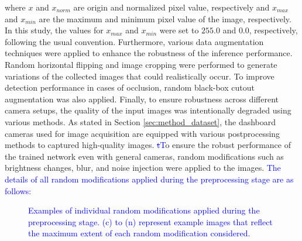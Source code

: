 where $x$ and $x_{norm}$ are origin and normalized pixel value, respectively and $x_{max}$ and $x_{min}$ are the maximum and minimum pixel value of the image, respectively.
In this study, the values for $x_{max}$ and $x_{min}$ were set to $255.0$ and $0.0$, respectively, following the usual convention.
Furthermore, various data augmentation techniques were applied to enhance the robustness of the inference performance.
Random horizontal flipping and image cropping were performed to generate variations of the collected images that could realistically occur.
To improve detection performance in cases of occlusion, random black-box cutout augmentation was also applied.
Finally, to ensure robustness across different camera setups, the quality of the input images was intentionally degraded using various methods.
As stated in Section \ref{sec:method_dataset}, the dashboard cameras used for image acquisition are equipped with various postprocessing methods to captured high-quality images.
\textcolor{blue}{ \sout{t}T}o ensure the robust performance of the trained network even with general cameras, random modifications such as brightness changes, blur, and noise injection were applied to the images.
\textcolor{blue}{The details of all random modifications applied during the preprocessing stage are as follows:}

\begin{figure}[t!]%

    \hfill

\caption{\textcolor{blue}{Examples of individual random modifications applied during the preprocessing stage. (c) to (n) represent example images that reflect the maximum extent of each random modification considered.}}
\label{fig:random}%
\end{figure}

